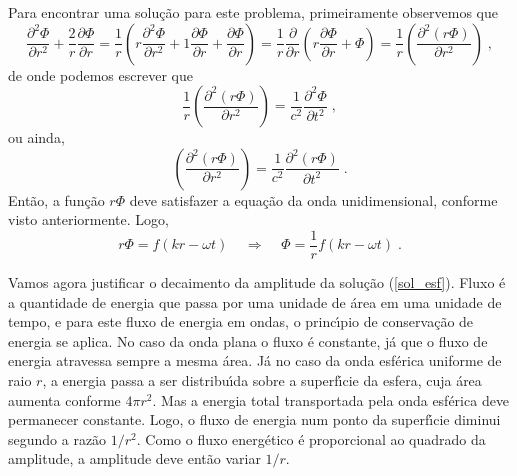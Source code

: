 Para encontrar uma solu\c{c}\~ao para este problema, primeiramente
observemos que
\begin{equation}
\frac{\partial^2 \Phi}{\partial r^2} + \frac{2}r{}\frac{\partial
\Phi}{\partial r} =\frac{1}{r} \left (r \frac{\partial^2
\Phi}{\partial r^2} + 1\frac{\partial \Phi}{\partial r} +
\frac{\partial \Phi}{\partial r} \right) = \frac{1}{r}
\frac{\partial}{\partial r}\left( r\frac{\partial \Phi}{\partial
r} +\Phi \right)= \frac{1}{r} \left( \frac{\partial^2
(r\Phi)}{\partial r^2} \right) \;,
\label{onda_esf_dem11}
\end{equation}
de onde podemos escrever que
\begin{equation}
\frac{1}{r} \left( \frac{\partial^2 (r\Phi)}{\partial r^2} \right)
= \frac{1}{c^2} \frac{\partial^2 \Phi}{\partial t^2}\;,
\label{onda_esf_dem1}
\end{equation}
ou ainda,
\begin{equation}
\left( \frac{\partial^2 (r\Phi)}{\partial r^2} \right) =
\frac{1}{c^2} \frac{\partial^2 (r\Phi)}{\partial t^2}\;.
\label{onda_esf_dem2}
\end{equation}
Ent\~ao, a fun\c{c}\~ao $r\Phi$ deve satisfazer a equa\c{c}\~ao da
onda unidimensional, conforme visto anteriormente. Logo,
\begin{equation}
r\Phi = f(kr-\omega t) \;\;\;\;\Rightarrow \;\;\;\; \Phi =
\frac{1}{r}f(kr-\omega t) \;. \label{sol_esf}
\end{equation}

Vamos agora justificar o decaimento da amplitude da solu\c{c}\~ao
(\ref{sol_esf}). Fluxo \'e a quantidade de energia que passa por
uma unidade de \'area em uma unidade de tempo, e para este fluxo
de energia em ondas, o princ\'{\i}pio de conserva\c{c}\~ao de
energia se aplica. No caso da onda plana o fluxo \'e constante,
j\'a que o fluxo de energia atravessa sempre a mesma \'area. J\'a
no caso da onda esf\'erica uniforme de raio $r$, a energia passa a
ser distribu\'{\i}da sobre a superf\'{\i}cie da esfera, cuja
\'area aumenta conforme $4\pi r^2$. Mas a energia total
transportada pela onda esf\'erica deve permanecer constante. Logo,
o fluxo de energia num ponto da superf\'{\i}cie diminui segundo a
raz\~ao $1/r^2$. Como o fluxo energ\'etico \'e proporcional ao
quadrado da amplitude, a amplitude deve ent\~ao variar $1/r$.
